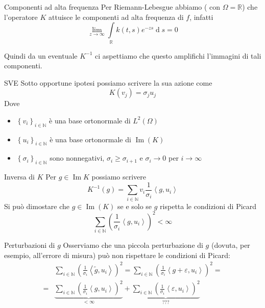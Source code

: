 \documentclass{beamer}
\theoremstyle{plain}
\theoremstyle{definition}
\theoremstyle{remark}
\newcommand{\set}[1]{\left\{#1\right\}}
\newcommand{\pa}[1]{\left(#1\right)}
\newcommand{\ang}[1]{\left<#1\right>}
\newcommand{\intl}{\int \limits}
\DeclareMathOperator{\de}{d}
\DeclareMathOperator{\im}{Im}
\begin{document}
\begin{frame}{Componenti ad alta frequenza}
  Per Riemann-Lebesgue abbiamo ( con $\Omega = \mathbb{R}$) che
  l'operatore $K$ attuisce le componenti ad alta frequenza di $f$,
  infatti
  \[ \lim _{z \to \infty} \intl _\mathbb{R} k(t,s) e^{-zs} \de s =
  0 \]

  Quindi da un eventuale $K^{-1}$ ci aspettiamo che questo amplifichi
  l'immagini di tali componenti.
\end{frame}

\begin{frame}{SVE}
  Sotto opportune ipotesi possiamo scrivere la sua azione come
  \[ K(v_j) = \sigma _j u_j \]
  Dove
  \begin{itemize}
  \item $\set{v_i}_{i\in \mathbb{N}}$ è una base ortonormale di
    $L^2(\Omega)$
  \item $\set{u_i}_{i\in \mathbb{N}}$ è una base ortonormale di
    $\im(K)$
  \item $\set{\sigma _i}_{i\in \mathbb{N}}$ sono nonnegativi, $\sigma
    _i \ge \sigma _{i+1}$ e $\sigma _i \to 0$ per $i \to \infty$
  \end{itemize}
\end{frame}

\begin{frame}{Inversa di $K$}
  Per $g \in \im{K}$ possiamo scrivere
  \[ K^{-1}(g) = \sum _{i\in \mathbb{N}} v_i \frac{1}{\sigma _i}
  \ang{g,u_i} \]
  \vfill
  Si può dimostare che $g\in \im (K)$ se e solo se $g$ rispetta le
  condizioni di Picard
  \[ \sum _{i\in \mathbb{N}} \pa{ \frac{1}{\sigma _i} \ang{g,u_i}} ^2
  < \infty \]
\end{frame}

\begin{frame}{Perturbazioni di $g$}
  Osserviamo che una piccola perturbazione di $g$ (dovuta, per
  esempio, all'errore di misura) può non rispettare le condizioni di
  Picard:
  \begin{align*}
    & \sum _{i\in \mathbb{N}} \pa{ \frac{1}{\sigma _i} \ang{\tilde
        g,u_i}} ^2 = \sum _{i\in \mathbb{N}} \pa{ \frac{1}{\sigma _i}
      \ang{g + \varepsilon,u_i}} ^2
    = \\
    =&\underbrace{\sum _{i\in \mathbb{N}} \pa{
          \frac{1}{\sigma _i} \ang{g,u_i}} ^2} _{<\infty}
    + \underbrace{\sum _{i\in \mathbb{N}} \pa{ \frac{1}{\sigma _i}
      \ang{\varepsilon,u_i}} ^2} _{???}
  \end{align*}
\end{frame}
\end{document}
